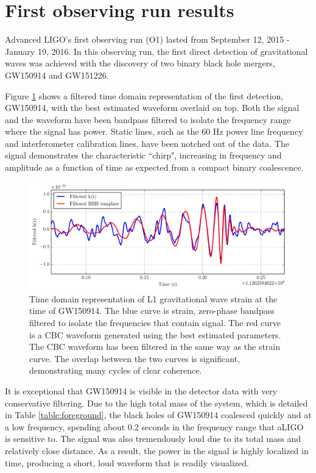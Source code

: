 \section{First observing run results}

Advanced LIGO's first observing run (O1) lasted from September 12, 2015 - 
January 19, 2016. In this observing run, the first direct detection of 
gravitational waves was achieved with the discovery of two binary black 
hole mergers, GW150914 and GW151226. 

Figure \ref{fig:GW150914} shows a 
filtered time domain representation of the first detection, GW150914, 
with the best estimated 
waveform overlaid on top. Both the signal and the waveform have been 
bandpass filtered to isolate the frequency range where the signal has 
power. Static lines, such as the 60 Hz power line frequency and 
interferometer calibration lines, have been notched out of the data. 
The signal demonstrates the characteristic ``chirp", 
increasing in frequency and amplitude as a function of time as  
expected from a compact binary coalescence. 

\begin{figure}[ht!]
\includegraphics[width=\textwidth]{figures/O1/GW150914-timeseries}
\caption[GW150914 timeseries]{Time domain representation of L1 %
        gravitational wave strain at the time of GW150914. The blue %
        curve is strain, zero-phase bandpass filtered to isolate the %
        frequencies that contain signal. The red curve is a CBC waveform %
        generated using the best estimated parameters. The CBC waveform %
        has been filtered in the same way as the strain curve. The overlap %
        between the two curves is significant, demonstrating many cycles %
        of clear coherence.}
\label{fig:GW150914}
\end{figure}

It is exceptional that GW150914 is visible in the detector data with 
very conservative filtering. Due to the high total mass of the system, 
which is detailed in Table \ref{table:foreground}, the black holes 
of GW150914 coalesced quickly and at a low frequency, spending about 
0.2 seconds in the frequency range that aLIGO is sensitive to. The 
signal was also tremendously loud due to its total mass and relatively 
close distance. 
As a result, the power in the signal is highly localized in time, 
producing a short, loud waveform that is readily visualized.

